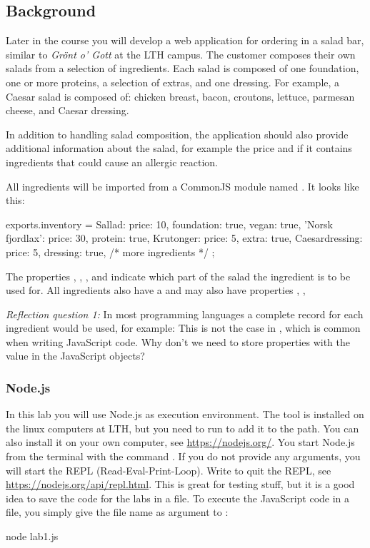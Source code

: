 \documentclass[fleqn, article, a4paper]{memoir}
\begin{document}
\subsection*{Background}

Later in the course you will develop a web application for ordering in a salad bar, similar to \emph{Grönt o' Gott} at the LTH campus. The customer composes their own salads from a selection of ingredients. Each salad is composed of one foundation, one or more proteins, a selection of extras, and one dressing. For example, a Caesar salad is composed of: chicken breast, bacon, croutons, lettuce, parmesan cheese, and Caesar dressing.

In addition to handling salad composition, the application should also provide additional information about the salad, for example the price and if it contains ingredients that could cause an allergic reaction.

\noindent All ingredients will be imported from a CommonJS module named . It looks like this:
\begin{Code}
exports.inventory = {
  Sallad: {price: 10, foundation: true, vegan: true}, 
  'Norsk fjordlax': {price: 30, protein: true},
  Krutonger: {price: 5, extra: true},
  Caesardressing: {price: 5, dressing: true},
  /* more ingredients */
};
\end{Code}
\noindent The properties , , , and  indicate which part of the salad the ingredient is to be used for. All ingredients also have a  and may also have properties , , 

\noindent \emph{Reflection question 1:} In most programming languages a complete record for each ingredient would be used, for example: 
This is not the case in , which is common when writing JavaScript code. Why don't we need to store properties with the value  in the JavaScript objects?


\subsubsection*{Node.js}

In this lab you will use Node.js as execution environment. The tool is installed on the linux computers at LTH, but you need to run  to add it to the path. You can also install it on your own computer, see \url{https://nodejs.org/}. You start Node.js from the terminal with the command . If you do not provide any arguments, you will start the REPL (Read-Eval-Print-Loop). Write  to quit the REPL, see \url{https://nodejs.org/api/repl.html}. This is great for testing stuff, but it is a good idea to save the code for the labs in a file. To execute the JavaScript code in a file, you simply give the file name as argument to :
\begin{Code}
  node lab1.js
\end{Code}
 
\end{document}
